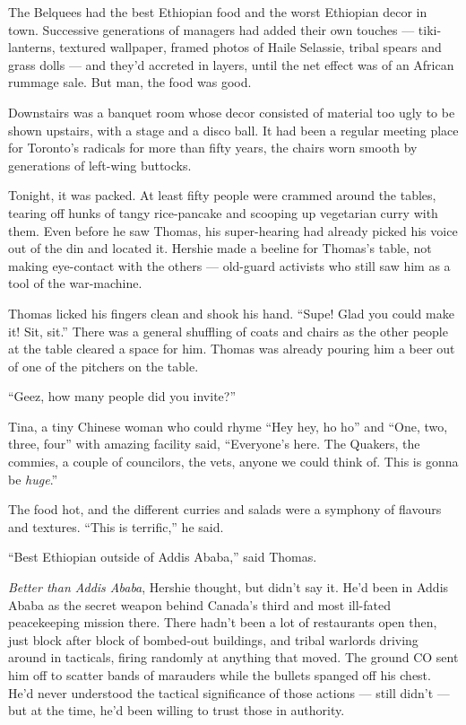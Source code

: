 \tb

The Belquees had the best Ethiopian food and the worst Ethiopian
decor in town. Successive generations of managers had added their
own touches --- tiki-lanterns, textured wallpaper, framed photos of
Haile Selassie, tribal spears and grass dolls --- and they'd
accreted in layers, until the net effect was of an African rummage
sale. But man, the food was good.

Downstairs was a banquet room whose decor consisted of material too
ugly to be shown upstairs, with a stage and a disco ball. It had
been a regular meeting place for Toronto's radicals for more than
fifty years, the chairs worn smooth by generations of left-wing
buttocks.

Tonight, it was packed. At least fifty people were crammed around
the tables, tearing off hunks of tangy rice-pancake and scooping up
vegetarian curry with them. Even before he saw Thomas, his
super-hearing had already picked his voice out of the din and
located it. Hershie made a beeline for Thomas's table, not making
eye-contact with the others --- old-guard activists who still saw
him as a tool of the war-machine.

Thomas licked his fingers clean and shook his hand.
``Supe! Glad you could make it! Sit, sit.'' There was a general
shuffling of coats and chairs as the other people at the table
cleared a space for him. Thomas was already pouring him a beer out
of one of the pitchers on the table.

``Geez, how many people did you invite?''

Tina, a tiny Chinese woman who could rhyme ``Hey hey, ho ho'' and
``One, two, three, four'' with amazing facility said,
``Everyone's here. The Quakers, the commies, a couple of councilors, the vets, 
anyone we could think of. This is gonna be \emph{huge}.''

The food hot, and the different curries and salads were a symphony
of flavours and textures. ``This is terrific,'' he said.

``Best Ethiopian outside of Addis Ababa,'' said Thomas.

\emph{Better than Addis Ababa}, Hershie thought, but didn't say it.
He'd been in Addis Ababa as the secret weapon behind Canada's third
and most ill-fated peacekeeping mission there. There hadn't been a
lot of restaurants open then, just block after block of bombed-out
buildings, and tribal warlords driving around in tacticals, firing
randomly at anything that moved. The ground CO sent him off to
scatter bands of marauders while the bullets spanged off his chest.
He'd never understood the tactical significance of those actions
--- still didn't --- but at the time, he'd been willing to trust
those in authority.

